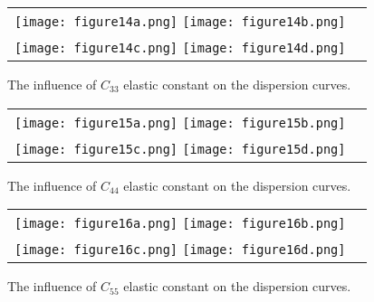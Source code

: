 \documentclass[]{spie}  %
\newcommand{\myfigscale}{0.9}
\begin{document}
\begin{figure} [ht]
	\begin{center}
		\begin{tabular}{cc} %
			\texttt{[image: figure14a.png]}
			\texttt{[image: figure14b.png]}\\
			\texttt{[image: figure14c.png]}
			\texttt{[image: figure14d.png]}
		\end{tabular}
	\end{center}
	\caption[] 
	{ \label{fig:C33} 
		The influence of \(C_{33}\) elastic constant on the dispersion curves.}
\end{figure} 

\begin{figure} [ht]
	\begin{center}
		\begin{tabular}{cc} %
			\texttt{[image: figure15a.png]}
			\texttt{[image: figure15b.png]}\\
			\texttt{[image: figure15c.png]}
			\texttt{[image: figure15d.png]}
		\end{tabular}
	\end{center}
	\caption[] 
	{ \label{fig:C44} 
		The influence of \(C_{44}\) elastic constant on the dispersion curves.}
\end{figure} 

\begin{figure} [ht]
	\begin{center}
		\begin{tabular}{cc} %
			\texttt{[image: figure16a.png]}
			\texttt{[image: figure16b.png]}\\
			\texttt{[image: figure16c.png]}
			\texttt{[image: figure16d.png]}
		\end{tabular}
	\end{center}
	\caption[] 
	{ \label{fig:C55} 
		The influence of \(C_{55}\) elastic constant on the dispersion curves.}
\end{figure} 
\end{document}
